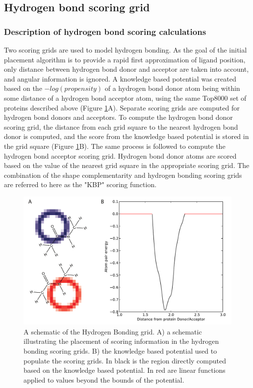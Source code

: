\subsection{Hydrogen bond scoring grid}

\subsubsection{Description of hydrogen bond scoring calculations}

Two scoring grids are used to model hydrogen bonding.
As the goal of the initial placement algorithm is to provide a rapid first approximation of ligand position, only distance between hydrogen bond donor and acceptor are taken into account, and angular information is ignored.
A knowledge based potential was created based on the $-log(propensity)$ of a hydrogen bond donor atom being within some distance of a hydrogen bond acceptor atom, using the same Top8000 set of proteins described above (Figure \ref{fig:hbond_schematic}A).
Separate scoring grids are computed for hydrogen bond donors and acceptors. To compute the hydrogen bond donor scoring grid, the distance from each grid square to the nearest hydrogen bond donor is computed, and the score from the knowledge based potential is stored in the grid square (Figure \ref{fig:hbond_schematic}B).
The same process is followed to compute the hydrogen bond acceptor scoring grid.
Hydrogen bond donor atoms are scored based on the value of the nearest grid square in the appropriate scoring grid.  
The combination of the shape complementarity and hydrogen bonding scoring grids are referred to here as the "\ac{KBP}" scoring function. 
\begin{figure}
\centering
\includegraphics[width=6in]{figures/lowres_appendix/Hydrogen_Bonding.pdf}
\caption{
A schematic of the Hydrogen Bonding grid.
A) a schematic illustrating the placement of scoring information in the hydrogen bonding scoring grids.
B) the knowledge based potential used to populate the scoring grids.
In black is the region directly computed based on the knowledge based potential.  In red are linear functions applied to values beyond the bounds of the potential.
}
\label{fig:hbond_schematic}
\end{figure}

